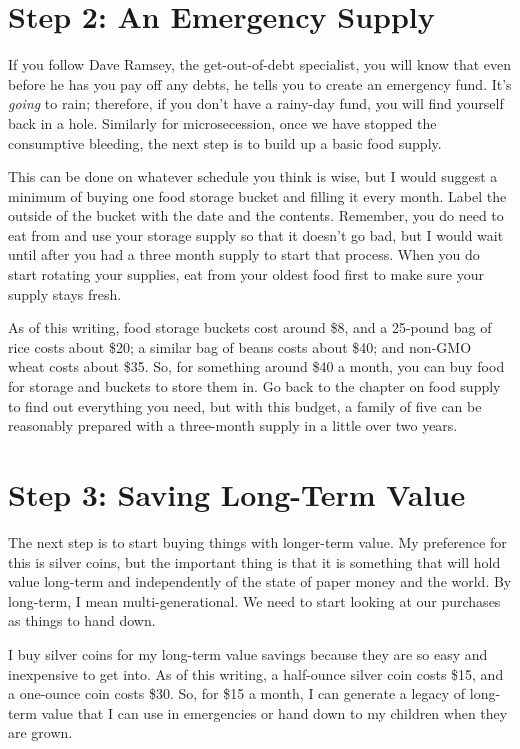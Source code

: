 \section{Step 2: An Emergency Supply}

If you follow Dave Ramsey, the get-out-of-debt specialist, you will know
that even before he has you pay off any debts, he tells you to create
an emergency fund. It's \textit{going} to rain;
therefore, if you don't have a rainy-day fund, you
will find yourself back in a hole. Similarly for microsecession, once
we have stopped the consumptive bleeding, the next step is to build up
a basic food supply. 

This can be done on whatever schedule you think is wise, but I would
suggest a minimum of buying one food storage bucket and filling it
every month. Label the outside of the bucket with the date and the
contents. Remember, you do need to eat from and use your storage supply
so that it doesn't go bad, but I would wait until
after you had a three month supply to start that process. When you do
start rotating your supplies, eat from your oldest food first to make
sure your supply stays fresh.

As of this writing, food storage buckets cost around \$8, and a 25-pound
bag of rice costs about \$20; a similar bag of beans costs about \$40;
and non-GMO wheat costs about \$35. So, for something around \$40 a
month, you can buy food for storage and buckets to store them in. Go
back to the chapter on food supply to find out everything you need, but
with this budget, a family of five can be reasonably prepared with a
three-month supply in a little over two years.

\section{Step 3: Saving Long-Term Value}

The next step is to start buying things with longer-term value. My
preference for this is silver coins, but the important thing is that it
is something that will hold value long-term and independently of the
state of paper money and the world. By long-term, I mean
multi-generational. We need to start looking at our purchases as things
to hand down.

I buy silver coins for my long-term value savings because they are so
easy and inexpensive to get into. As of this writing, a half-ounce
silver coin costs \$15, and a one-ounce coin costs \$30. So, for \$15 a
month, I can generate a legacy of long-term value that I can use in
emergencies or hand down to my children when they are grown.

